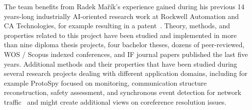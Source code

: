 The team benefits from Radek Mařík's experience gained during his previous 14 years-long industrially AI-oriented research work at Rockwell Automation and CA Technologies, for example resulting in a patent~\cite{Marik2011}. Theory, methods, and properties related to this project have been studied and implemented in more than nine diploma thesis projects, four bachelor theses, dozens of peer-reviewed, WOS / Scopus indexed conferences, and IF journal papers published the last five years. Additional methods and their properties that have been studied during several research projects dealing with different application domains, including for example ProtoSpy focused on monitoring, communication structure reconstruction, safety assessment, and synchronous event detection for network traffic~\cite{Marik2015b,Marik2014a} and might create additional views on coreference resolution issues.

